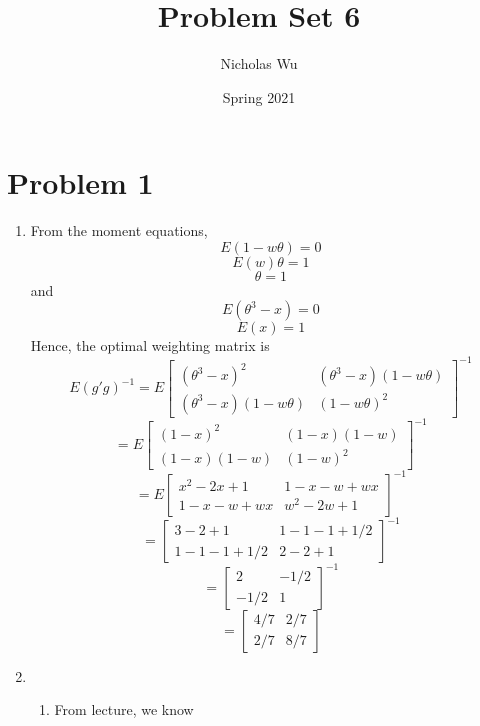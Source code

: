 \documentclass[10pt,letter]{article}
\begin{document}


\title{Problem Set 6}

\author{Nicholas Wu}

\date{Spring 2021}

\maketitle


\section*{Problem 1}
\begin{enumerate}[label=(\alph*)]
\item From the moment equations,
\[ E(1-w\theta) = 0 \]
\[ E(w)\theta = 1 \]
\[ \theta = 1\]
and
\[ E(\theta^3 - x) = 0 \]
\[ E(x) = 1 \]
Hence, the optimal weighting matrix is
\[ E(g'g)^{-1} = E\begin{bmatrix} (\theta^3 - x)^2 & (\theta^3 - x)(1-w\theta) \\ (\theta^3 - x)(1-w\theta) & (1 - w\theta)^2 \end{bmatrix}^{-1} \]
\[ = E\begin{bmatrix} (1-x)^2 & (1-x)(1-w) \\ (1-x)(1-w) & (1-w)^2 \end{bmatrix}^{-1} \]
\[ = E\begin{bmatrix} x^2 - 2x + 1 & 1 - x - w + wx \\ 1 - x - w + wx & w^2 - 2w + 1 \end{bmatrix}^{-1} \]
\[ = \begin{bmatrix} 3 - 2 + 1 & 1 - 1 - 1 + 1/2 \\ 1 - 1 - 1 + 1/2 & 2 - 2 + 1 \end{bmatrix}^{-1} \]
\[ = \begin{bmatrix} 2 &  - 1/2 \\ - 1/2 & 1 \end{bmatrix}^{-1} \]
\[ = \begin{bmatrix} 4/7 &  2/7 \\ 2/7 & 8/7 \end{bmatrix} \]
\item \begin{enumerate}[label=(\roman*)]
\item From lecture, we know

\end{enumerate}
\end{enumerate}
\end{document}
